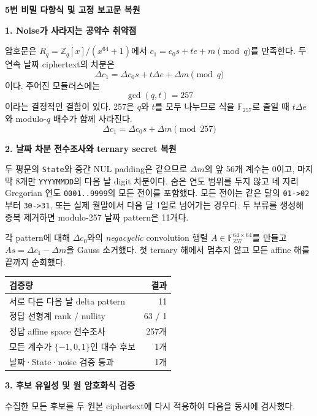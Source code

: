 \documentclass[11pt,a4paper]{article}
\begin{document}
\begin{center}
  {\LARGE\bfseries 5번 비밀 다항식 및 고정 보고문 복원}\par
\end{center}
\vspace{1mm}

\textbf{\large 1. Noise가 사라지는 공약수 취약점}

암호문은 $R_q=\mathbb Z_q[x]/(x^{64}+1)$에서
$c_1=c_0s+te+m\pmod q$를 만족한다. 두 연속 날짜 ciphertext의 차분은
\[
  \Delta c_1=\Delta c_0s+t\Delta e+\Delta m\pmod q
\]
이다. 주어진 모듈러스에는
\[
  \boxed{\gcd(q,t)=257}
\]
이라는 결정적인 결함이 있다. 257은 $q$와 $t$를 모두 나누므로 식을
$\mathbb F_{257}$로 줄일 때 $t\Delta e$와 modulo-$q$ 배수가 함께
사라진다.
\[
  \boxed{\Delta c_1=\Delta c_0s+\Delta m\pmod {257}}
\]

\textbf{\large 2. 날짜 차분 전수조사와 ternary secret 복원}

두 평문의 \texttt{State}와 중간 NUL padding은 같으므로
$\Delta m$의 앞 56개 계수는 0이고, 마지막 8개만
\texttt{YYYYMMDD}의 다음 날 digit 차분이다. 숨은 연도 범위를 두지
않고 네 자리 Gregorian 연도 \texttt{0001..9999}의 모든 전이를
포함했다. 모든 전이는 같은 달의 \texttt{01->02}부터
\texttt{30->31}, 또는 실제 월말에서 다음 달 1일로 넘어가는 경우다.
두 부류를 생성해 중복 제거하면 modulo-257 날짜 pattern은 11개다.

각 pattern에 대해 $\Delta c_0$와의 \emph{negacyclic} convolution
행렬 $A\in\mathbb F_{257}^{64\times64}$를 만들고
$As=\Delta c_1-\Delta m$을 Gauss 소거했다. 첫 ternary 해에서
멈추지 않고 모든 affine 해를 끝까지 순회했다.

\begin{center}
\begin{tabular}{lr}
\toprule
검증량 & 결과 \\
\midrule
서로 다른 다음 날 delta pattern & 11 \\
정답 선형계 rank / nullity & 63 / 1 \\
정답 affine space 전수조사 & 257개 \\
모든 계수가 $\{-1,0,1\}$인 대수 후보 & 1개 \\
날짜·State·noise 검증 통과 & 1개 \\
\bottomrule
\end{tabular}
\end{center}

\textbf{\large 3. 후보 유일성 및 원 암호화식 검증}

수집한 모든 후보를 두 원본 ciphertext에 다시 적용하여 다음을
동시에 검사했다.
\end{document}
